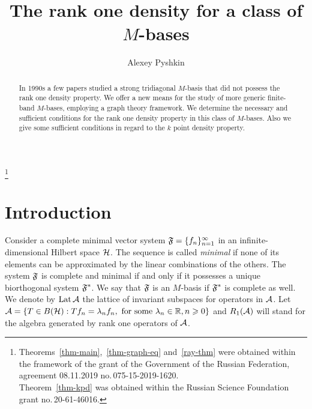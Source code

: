 \documentclass[12pt,oneside,a4paper]{amsart}
\begin{document}
\title{The rank one density for a class of $M$-bases}
\author{Alexey Pyshkin}
\address{Chebyshev Laboratory, Saint Petersburg State University, 14th Line V.O. 29, Saint Petersburg 199178, Russia}
\address{Saint Petersburg Department of RAS, Steklov Math. Institute, Fontanka 27, Saint Petersburg 191023, Russia}
\address{Euler International Mathematical Institute, nab.\,Pesochnaya 10, Saint Petersburg 197022, Russia}


\begin{abstract}
  In 1990s a few papers studied a strong tridiagonal $M$-basis
    that did not possess the rank one density property.
  We offer a new means for the study of more generic finite-band $M$-bases,
    employing a graph theory framework.
  We determine the necessary and sufficient conditions for the rank one density property
    in this class of $M$-bases.
  Also we give some sufficient conditions in regard to the $k$ point density property.
\end{abstract}
\thanks{Theorems~\ref{thm-main},~\ref{thm-graph-eq} and~\ref{ray-thm} were obtained within the framework of
          the grant of the Government of the Russian Federation, agreement 08.11.2019 no.\,075-15-2019-1620.\\
        Theorem~\ref{thm-kpd} was obtained within the Russian Science Foundation grant no.\,20-61-46016.
        }
\maketitle
\section{Introduction}
  Consider a complete minimal vector system $\fsys = \seq{f}$ in an infinite-dimensional Hilbert space $\cal{H}$.
  The sequence is called \emph{minimal} if none of its elements can be approximated by the linear combinations of the others.
  The system $\fsys$ is complete and minimal if and only if it possesses a unique biorthogonal system $\fstarsys$.
  We say that $\fsys$ is an $M$-basis if $\fstarsys$ is complete as well.
  We denote by $\lattice$ the lattice of invariant subspaces for operators in $\cal{A}$.
  Let $\cal{A} = \{T\in B(\cal{H}): Tf_n = \lambda_n f_n, \text{ for some } \lambda_n \in \mathbb{R}, n \geq 0\}$
    and $R_1(\cal{A})$ will stand for the algebra generated by rank one operators of $\cal{A}$.
\end{document}
